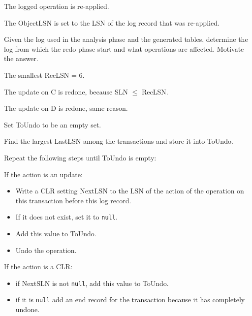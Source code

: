 \documentclass{beamer}
\begin{document}
\begin{slide}{
	\item The logged operation is re-applied.
	\item The ObjectLSN is set to the LSN of the log record that was re-applied.
}\end{slide}

\begin{slide}{
	\item Given the log used in the analysis phase and the generated tables, determine the log from which the redo phase start and what operations are affected. Motivate the answer.
		
	\vspace{1cm}
	\item The smallest RecLSN = 6.
	\item The update on C is redone, because SLN $\leq$ RecLSN.
	\item The update on D is redone, same reason.	
}\end{slide}

\begin{slide}{
	\item Set ToUndo to be an empty set.
	\item Find the largest LastLSN among the transactions and store it into ToUndo.
	\item Repeat the following steps until ToUndo is empty:
	\item If the action is an update:
	\begin{itemize}
		\item Write a CLR setting NextLSN to the LSN of the action of the operation on this transaction before this log record.
		\item If it does not exist, set it to \texttt{null}.
		\item Add this value to ToUndo.
		\item Undo the operation. 
	\end{itemize} 
	\item If the action is a CLR:
		\begin{itemize}
			\item if NextSLN is not \texttt{null}, add this value to ToUndo.
			\item if it is \texttt{null} add an end record for the transaction because it has completely undone.
		\end{itemize}
}\end{slide}
\end{document}
